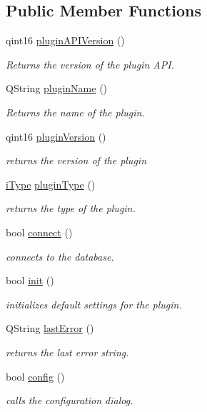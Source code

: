 \subsection*{Public Member Functions}
\begin{DoxyCompactItemize}
\item 
qint16 \hyperlink{classc_my_s_q_l_plugin_afbcc9dc99700cecd230b70d0384b0fd2}{plugin\+A\+P\+I\+Version} ()
\begin{DoxyCompactList}\small\item\em Returns the version of the plugin A\+PI. \end{DoxyCompactList}\item 
Q\+String \hyperlink{classc_my_s_q_l_plugin_ae8eed8a248ddbb3f8372290571ddfb24}{plugin\+Name} ()
\begin{DoxyCompactList}\small\item\em Returns the name of the plugin. \end{DoxyCompactList}\item 
qint16 \hyperlink{classc_my_s_q_l_plugin_af9f85d9af71685b373b114d8d2d98c6a}{plugin\+Version} ()
\begin{DoxyCompactList}\small\item\em returns the version of the plugin \end{DoxyCompactList}\item 
\hyperlink{classc_interface_a41462a3131755963add9ba3026e7d31a}{i\+Type} \hyperlink{classc_my_s_q_l_plugin_a76618f3bd8846fab6e3572e30df6fae7}{plugin\+Type} ()
\begin{DoxyCompactList}\small\item\em returns the type of the plugin. \end{DoxyCompactList}\item 
bool \hyperlink{classc_my_s_q_l_plugin_a137309c4dea786cc0cbd2d7db9acff11}{connect} ()
\begin{DoxyCompactList}\small\item\em connects to the database. \end{DoxyCompactList}\item 
bool \hyperlink{classc_my_s_q_l_plugin_ab64cecb567902902ef25fd3cf7346a4c}{init} ()
\begin{DoxyCompactList}\small\item\em initializes default settings for the plugin. \end{DoxyCompactList}\item 
Q\+String \hyperlink{classc_my_s_q_l_plugin_a8e175f45e12bf3716af0dd5728710cda}{last\+Error} ()
\begin{DoxyCompactList}\small\item\em returns the last error string. \end{DoxyCompactList}\item 
bool \hyperlink{classc_my_s_q_l_plugin_ad8413f2440b3ce4390865bb08d238441}{config} ()
\begin{DoxyCompactList}\small\item\em calls the configuration dialog. \end{DoxyCompactList}\end{DoxyCompactItemize}
